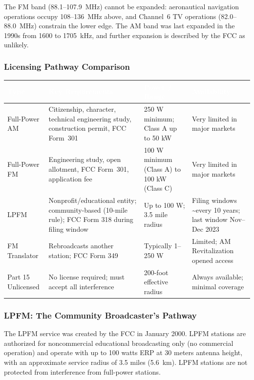 \documentclass[11pt,letterpaper]{article}
\newcommand{\tableheader}[1]{\textbf{\sffamily\textcolor{white}{#1}}}
\begin{document}
\begin{asciibox}
The FM band (88.1--107.9~MHz) cannot be expanded: aeronautical navigation operations occupy
108--136~MHz above, and Channel~6 TV operations (82.0--88.0~MHz) constrain the lower edge.
The AM band was last expanded in the 1990s from 1600 to 1705~kHz, and further expansion is
described by the FCC as unlikely.

\subsubsection{Licensing Pathway Comparison}

\begin{center}
\begin{tabularx}{\textwidth}{L{2.2cm}XL{2.5cm}L{2.2cm}}
\toprule
{}
\tableheader{Type} & \tableheader{Key Requirements} & \tableheader{Power / Range} & \tableheader{Availability} \\
\midrule
Full-Power AM & Citizenship, character, technical engineering study, construction permit, FCC Form~301 & 250 W minimum; Class A up to 50 kW & Very limited in major markets \\
Full-Power FM & Engineering study, open allotment, FCC Form~301, application fee & 100 W minimum (Class A) to 100 kW (Class C) & Very limited in major markets \\
LPFM & Nonprofit/educational entity; community-based (10-mile rule); FCC Form 318 during filing window & Up to 100 W; 3.5 mile radius & Filing windows \textasciitilde{}every 10 years; last window Nov--Dec 2023 \\
FM Translator & Rebroadcasts another station; FCC Form 349 & Typically 1--250 W & Limited; AM Revitalization opened access \\
Part 15 Unlicensed & No license required; must accept all interference & 200-foot effective radius & Always available; minimal coverage \\
\bottomrule
\end{tabularx}
\end{center}

\subsubsection{LPFM: The Community Broadcaster's Pathway}

The LPFM service was created by the FCC in January 2000. LPFM stations are authorized for
noncommercial educational broadcasting only (no commercial operation) and operate with up to
100 watts ERP at 30 meters antenna height, with an approximate service radius of 3.5 miles
(5.6~km). LPFM stations are not protected from interference from full-power stations.


\end{asciibox}
\end{document}
